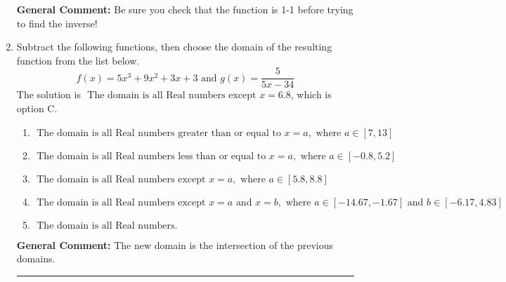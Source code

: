 \documentclass{extbook}[14pt]
\newcommand{\litem}[1]{\item #1

\rule{\textwidth}{0.4pt}}
\begin{document}
\begin{enumerate}
{\textbf{General Comment:} Be sure you check that the function is 1-1 before trying to find the inverse!
}
\litem{
Subtract the following functions, then choose the domain of the resulting function from the list below.
\[ f(x) = 5x^{3} +9 x^{2} +3 x + 3 \text{ and } g(x) = \frac{5}{5x-34} \]The solution is \( \text{ The domain is all Real numbers except } x = 6.8 \), which is option C.\begin{enumerate}[label=\Alph*.]
\item \( \text{ The domain is all Real numbers greater than or equal to } x = a, \text{ where } a \in [7, 13] \)


\item \( \text{ The domain is all Real numbers less than or equal to } x = a, \text{ where } a \in [-0.8, 5.2] \)


\item \( \text{ The domain is all Real numbers except } x = a, \text{ where } a \in [5.8, 8.8] \)


\item \( \text{ The domain is all Real numbers except } x = a \text{ and } x = b, \text{ where } a \in [-14.67, -1.67] \text{ and } b \in [-6.17, 4.83] \)


\item \( \text{ The domain is all Real numbers. } \)


\end{enumerate}

\textbf{General Comment:} The new domain is the intersection of the previous domains.
}
\end{enumerate}
\end{document}
